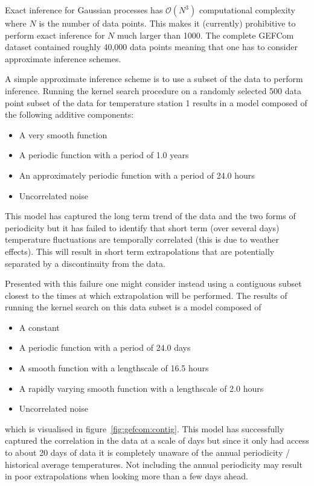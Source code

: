 Exact inference for Gaussian processes has $\mathcal{O}(N^3)$  computational complexity where $N$ is the number of data points.
This makes it (currently) prohibitive to perform exact inference for $N$ much larger than 1000.
The complete GEFCom dataset contained roughly 40,000 data points meaning that one has to consider approximate inference schemes.

A simple approximate inference scheme is to use a subset of the data to perform inference\citep[e.g.][]{Quinonero-Candela2005-er}.
Running the kernel search procedure on a randomly selected 500 data point subset of the data for temperature station 1 results in a model composed of the following additive components:
\begin{itemize}
  \item A very smooth function
  \item A periodic function with a period of 1.0 years
  \item An approximately periodic function with a period of 24.0 hours
  \item Uncorrelated noise
\end{itemize}
This model has captured the long term trend of the data and the two forms of periodicity but it has failed to identify that short term (over several days) temperature fluctuations are temporally correlated (this is due to weather effects).
This will result in short term extrapolations that are potentially separated by a discontinuity from the data.

Presented with this failure one might consider instead using a contiguous subset closest to the times at which extrapolation will be performed.
The results of running the kernel search on this data subset is a model composed of
\begin{itemize}
  \item A constant
  \item A periodic function with a period of 24.0 days
  \item A smooth function with a lengthscale of 16.5 hours
  \item A rapidly varying smooth function with a lengthscale of 2.0 hours
  \item Uncorrelated noise
\end{itemize}
which is visualised in figure~\ref{fig:gefcom:contig}.
This model has successfully captured the correlation in the data at a scale of days but since it only had access to about 20 days of data it is completely unaware of the annual periodicity / historical average temperatures.
Not including the annual periodicity may result in poor extrapolations when looking more than a few days ahead.

